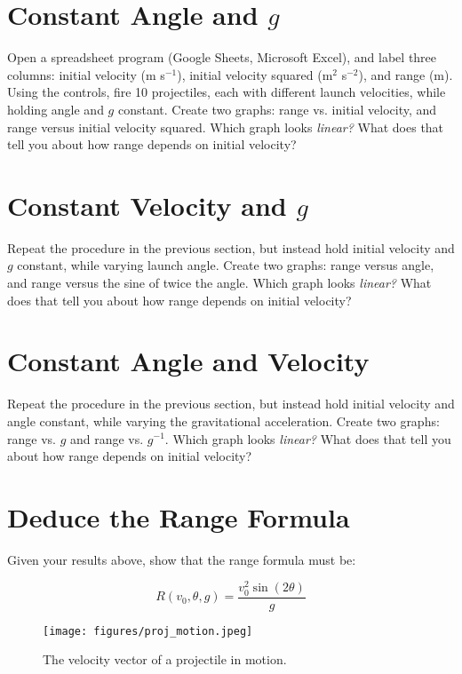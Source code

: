 \documentclass{article}
\begin{document}
\section{Constant Angle and $g$}

Open a spreadsheet program (Google Sheets, Microsoft Excel), and label three columns: initial velocity (m s$^{-1}$), initial velocity squared (m$^2$ s$^{-2}$), and range (m).  Using the controls, fire 10 projectiles, each with different launch velocities, while holding angle and $g$ constant.  Create two graphs: range vs. initial velocity, and range versus initial velocity squared.  Which graph looks \textit{linear?}  What does that tell you about how range depends on initial velocity?

\section{Constant Velocity and $g$}

Repeat the procedure in the previous section, but instead hold initial velocity and $g$ constant, while varying launch angle.  Create two graphs: range versus angle, and range versus the sine of twice the angle.  Which graph looks \textit{linear?}  What does that tell you about how range depends on initial velocity?

\section{Constant Angle and Velocity}

Repeat the procedure in the previous section, but instead hold initial velocity and angle constant, while varying the gravitational acceleration.  Create two graphs: range vs. $g$ and range vs. $g^{-1}$.  Which graph looks \textit{linear?}  What does that tell you about how range depends on initial velocity?

\section{Deduce the Range Formula}

Given your results above, show that the range formula must be:

\begin{equation}
R(v_0,\theta,g) = \frac{v_0^2\sin(2\theta)}{g}
\end{equation}

\begin{figure}[hb]
\centering
\texttt{[image: figures/proj\_motion.jpeg]}
\caption{\label{fig:1} The velocity vector of a projectile in motion.}
\end{figure}
\end{document}
